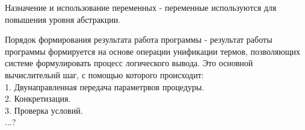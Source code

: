 Назначение и использование переменных - переменные используются для повышения уровня абстракции. 

Порядок формирования результата работа программы - результат работы программы формируется на основе операции унификации термов, позволяющих системе формулировать процесс логического вывода. Это основной вычислительнй шаг, с помощью которого происходит:\\
1. Двунаправленная передача параметрвов процедуры.\\
2. Конкретизация.\\
3. Проверка условий.\\
...?